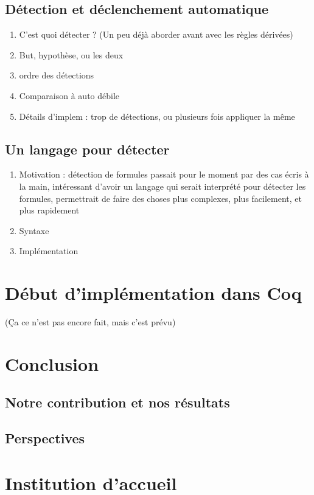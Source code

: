 \documentclass[titlepage,draft]{article}
\begin{document}
\subsection{Détection et déclenchement automatique}
\begin{enumerate}
    \item C'est quoi détecter ? (Un peu déjà aborder avant avec les règles dérivées)
    \item But, hypothèse, ou les deux
    \item ordre des détections
    \item Comparaison à auto débile
    \item Détails d'implem : trop de détections, ou plusieurs fois appliquer la même
\end{enumerate}

\subsection{Un langage pour détecter}
\begin{enumerate}
    \item Motivation : détection de formules passait pour le moment par des cas écris à la main, intéressant d'avoir un langage qui serait interprété pour détecter les formules, permettrait de faire des choses plus complexes, plus facilement, et plus rapidement
    \item Syntaxe
    \item Implémentation
\end{enumerate}

\section{Début d'implémentation dans Coq} \label{Implémentation}
(Ça ce n'est pas encore fait, mais c'est prévu)

\section{Conclusion}
\subsection{Notre contribution et nos résultats}
\subsection{Perspectives}

\appendix
\section{Institution d'accueil}
\end{document}
